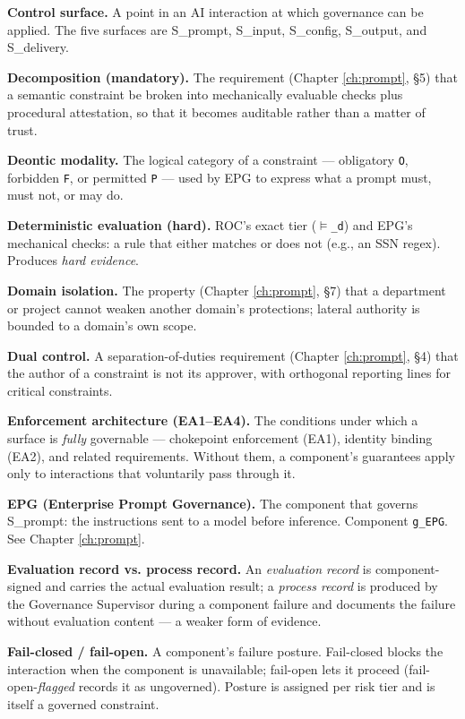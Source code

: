 \textbf{Control surface.} A point in an AI interaction at which governance can be
applied. The five surfaces are S\_\allowbreak{}prompt, S\_\allowbreak{}input, S\_\allowbreak{}config, S\_\allowbreak{}output, and
S\_\allowbreak{}delivery.

\textbf{Decomposition (mandatory).} The requirement (Chapter \ref{ch:prompt}, \S{}5) that a semantic
constraint be broken into mechanically evaluable checks plus procedural
attestation, so that it becomes auditable rather than a matter of trust.

\textbf{Deontic modality.} The logical category of a constraint --- obligatory \texttt{O},
forbidden \texttt{F}, or permitted \texttt{P} --- used by EPG to express what a prompt must, must
not, or may do.

\textbf{Deterministic evaluation (hard).} ROC's exact tier (\texttt{$\vDash$\_\allowbreak{}d}) and EPG's mechanical
checks: a rule that either matches or does not (e.g., an SSN regex). Produces
\emph{hard evidence}.

\textbf{Domain isolation.} The property (Chapter \ref{ch:prompt}, \S{}7) that a department or project
cannot weaken another domain's protections; lateral authority is bounded to a
domain's own scope.

\textbf{Dual control.} A separation-of-duties requirement (Chapter \ref{ch:prompt}, \S{}4) that the
author of a constraint is not its approver, with orthogonal reporting lines for
critical constraints.

\textbf{Enforcement architecture (EA1--EA4).} The conditions under which a surface is
\emph{fully} governable --- chokepoint enforcement (EA1), identity binding (EA2), and
related requirements. Without them, a component's guarantees apply only to
interactions that voluntarily pass through it.

\textbf{EPG (Enterprise Prompt Governance).} The component that governs S\_\allowbreak{}prompt: the
instructions sent to a model before inference. Component \texttt{g\_\allowbreak{}EPG}. See Chapter \ref{ch:prompt}.

\textbf{Evaluation record vs. process record.} An \emph{evaluation record} is
component-signed and carries the actual evaluation result; a \emph{process record} is
produced by the Governance Supervisor during a component failure and documents
the failure without evaluation content --- a weaker form of evidence.

\textbf{Fail-closed / fail-open.} A component's failure posture. Fail-closed blocks the
interaction when the component is unavailable; fail-open lets it proceed
(fail-open-\emph{flagged} records it as ungoverned). Posture is assigned per risk tier
and is itself a governed constraint.

